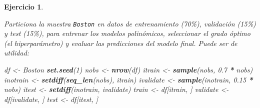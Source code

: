 \documentclass[
]{book}
\newenvironment{Shaded}{\begin{snugshade}}{\end{snugshade}}
\newcommand{\DecValTok}[1]{\textcolor[rgb]{0.00,0.00,0.81}{#1}}
\newcommand{\FloatTok}[1]{\textcolor[rgb]{0.00,0.00,0.81}{#1}}
\newcommand{\FunctionTok}[1]{\textcolor[rgb]{0.13,0.29,0.53}{\textbf{#1}}}
\newcommand{\NormalTok}[1]{#1}
\newcommand{\OtherTok}[1]{\textcolor[rgb]{0.56,0.35,0.01}{#1}}
\newcommand{\SpecialCharTok}[1]{\textcolor[rgb]{0.81,0.36,0.00}{\textbf{#1}}}
\theoremstyle{break}
\newtheorem{exercise}{Ejercicio}[chapter]
\theoremstyle{nonumberplain}
\begin{document}
\begin{exercise}
\protect\hypertarget{exr:train-validate-test}{}\label{exr:train-validate-test}

Particiona la muestra \texttt{Boston} en datos de entrenamiento (70\%), validación (15\%) y test (15\%), para entrenar los modelos polinómicos, seleccionar el grado óptimo (el hiperparámetro) y evaluar las predicciones del modelo final. Puede ser de utilidad:

\begin{Shaded}
\begin{Highlighting}[]
\NormalTok{df }\OtherTok{\textless{}{-}}\NormalTok{ Boston}
\FunctionTok{set.seed}\NormalTok{(}\DecValTok{1}\NormalTok{)}
\NormalTok{nobs }\OtherTok{\textless{}{-}} \FunctionTok{nrow}\NormalTok{(df)}
\NormalTok{itrain }\OtherTok{\textless{}{-}} \FunctionTok{sample}\NormalTok{(nobs, }\FloatTok{0.7} \SpecialCharTok{*}\NormalTok{ nobs)}
\NormalTok{inotrain }\OtherTok{\textless{}{-}} \FunctionTok{setdiff}\NormalTok{(}\FunctionTok{seq\_len}\NormalTok{(nobs), itrain)}
\NormalTok{ivalidate }\OtherTok{\textless{}{-}} \FunctionTok{sample}\NormalTok{(inotrain, }\FloatTok{0.15} \SpecialCharTok{*}\NormalTok{ nobs)}
\NormalTok{itest }\OtherTok{\textless{}{-}} \FunctionTok{setdiff}\NormalTok{(inotrain, ivalidate)}
\NormalTok{train }\OtherTok{\textless{}{-}}\NormalTok{ df[itrain, ]}
\NormalTok{validate }\OtherTok{\textless{}{-}}\NormalTok{ df[ivalidate, ]}
\NormalTok{test }\OtherTok{\textless{}{-}}\NormalTok{ df[itest, ]}
\end{Highlighting}
\end{Shaded}

\end{exercise}
\end{document}
